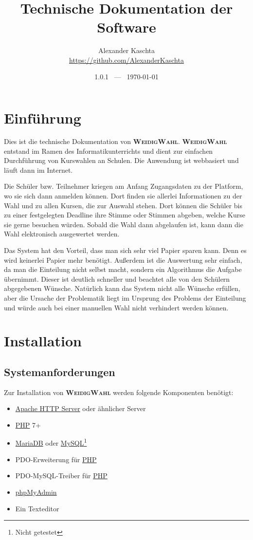 \documentclass[ngerman]{ltxdoc}
\title{Technische Dokumentation der Software \name}
\author{Alexander Kaschta \\ \url{https://github.com/AlexanderKaschta}}
\date{1.0.1 ~---~ \today}
\newcommand{\name}{\textbf{\textsc{WeidigWahl}}\xspace}
\begin{document}
\maketitle
\tableofcontents

\section{Einführung}

Dies ist die technische Dokumentation von \name. \name entstand im Ramen des
Informatikunterrichts und dient zur einfachen Durchführung von Kurswahlen an Schulen.
Die Anwendung ist webbasiert und läuft dann im Internet.

Die Schüler bzw. Teilnehmer kriegen am Anfang Zugangsdaten zu der Platform, wo
sie sich dann anmelden können. Dort finden sie allerlei Informationen zu der Wahl
und zu allen Kursen, die zur Auswahl stehen. Dort können die Schüler bis zu einer
festgelegten Deadline ihre Stimme oder Stimmen abgeben, welche Kurse sie gerne
besuchen würden. Sobald die Wahl dann abgelaufen ist, kann dann die Wahl
elektronisch ausgewertet werden.

Das System hat den Vorteil, dass man sich sehr viel Papier sparen kann. Denn es
wird keinerlei Papier mehr benötigt. Außerdem ist die Auswertung sehr einfach, da
man die Einteilung nicht selbst macht, sondern ein Algorithmus die Aufgabe übernimmt.
Dieser ist deutlich schneller und beachtet alle von den Schülern abgegebenen Wünsche.
Natürlich kann das System nicht alle Wünsche erfüllen, aber die Ursache der Problematik
liegt im Ursprung des Problems der Einteilung und würde auch bei einer manuellen
Wahl nicht verhindert werden können.

\section{Installation}

\subsection{Systemanforderungen}

Zur Installation von \name werden folgende Komponenten benötigt:

\begin{itemize}
  \item \href{http://httpd.apache.org/}{Apache HTTP Server} oder ähnlicher Server
  \item \href{https://www.php.net/}{PHP} 7+
  \item \href{https://mariadb.org/}{MariaDB} oder \href{https://www.mysql.com/}{MySQL}\footnote{Nicht getestet}
  \item PDO-Erweiterung für \href{https://www.php.net/}{PHP}
  \item PDO-MySQL-Treiber für \href{https://www.php.net/}{PHP}
  \item \href{https://www.phpmyadmin.net/}{phpMyAdmin}
  \item Ein Texteditor
\end{itemize}
\end{document}
